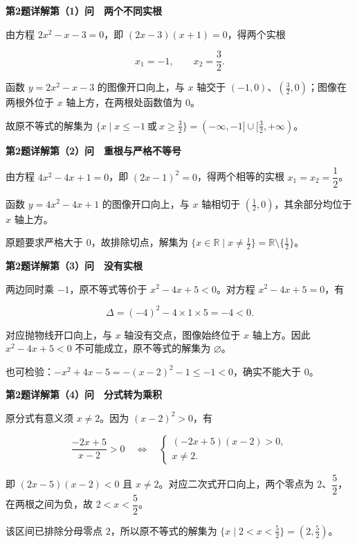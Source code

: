 \documentclass[UTF8,10pt,aspectratio=169]{ctexbeamer}
\newcommand{\PageHeading}[1]{\begin{center}{\Large\bfseries #1}\end{center}\vspace{0.12cm}}
\begin{document}
\begin{frame}[t]
\PageHeading{第2题详解\quad 第（1）问　两个不同实根}
由方程 $2x^2-x-3=0$，即 $(2x-3)(x+1)=0$，得两个实根
\par
\pause
\[x_1=-1,\qquad x_2=\frac32.\]
\par
函数 $y=2x^2-x-3$ 的图像开口向上，与 $x$ 轴交于 $(-1,0)$、$(\frac32,0)$；图像在两根外位于 $x$ 轴上方，在两根处函数值为 $0$。
\par
故原不等式的解集为 $\boxed{\{x\mid x\le-1\ \text{或}\ x\ge\frac32\}=(-\infty,-1]\cup[\frac32,+\infty)}$。
\par
\end{frame}
\begin{frame}[t]
\PageHeading{第2题详解\quad 第（2）问　重根与严格不等号}
由方程 $4x^2-4x+1=0$，即 $(2x-1)^2=0$，得两个相等的实根 $x_1=x_2=\dfrac12$。
\par
\pause
函数 $y=4x^2-4x+1$ 的图像开口向上，与 $x$ 轴相切于 $(\frac12,0)$，其余部分均位于 $x$ 轴上方。
\par
原题要求严格大于 $0$，故排除切点，解集为 $\boxed{\{x\in\mathbb R\mid x\ne\frac12\}=\mathbb R\setminus\{\frac12\}}$。
\par
\end{frame}
\begin{frame}[t]
\PageHeading{第2题详解\quad 第（3）问　没有实根}
两边同时乘 $-1$，原不等式等价于 $x^2-4x+5<0$。对方程 $x^2-4x+5=0$，有
\par
\pause
\[\Delta=(-4)^2-4\times1\times5=-4<0.\]
\par
对应抛物线开口向上，与 $x$ 轴没有交点，图像始终位于 $x$ 轴上方。因此 $x^2-4x+5<0$ 不可能成立，原不等式的解集为 $\boxed{\varnothing}$。
\par
也可检验：$-x^2+4x-5=-(x-2)^2-1\le-1<0$，确实不能大于 $0$。
\par
\end{frame}
\begin{frame}[t]
\PageHeading{第2题详解\quad 第（4）问　分式转为乘积}
原分式有意义须 $x\ne2$。因为 $(x-2)^2>0$，有
\par
\pause
\[\frac{-2x+5}{x-2}>0\quad\Longleftrightarrow\quad\begin{cases}(-2x+5)(x-2)>0,\\x\ne2.\end{cases}\]
\par
即 $(2x-5)(x-2)<0$ 且 $x\ne2$。对应二次式开口向上，两个零点为 $2$、$\dfrac52$，在两根之间为负，故 $2<x<\dfrac52$。
\par
该区间已排除分母零点 $2$，所以原不等式的解集为 $\boxed{\{x\mid2<x<\frac52\}=(2,\frac52)}$。
\par
\end{frame}
\end{document}
